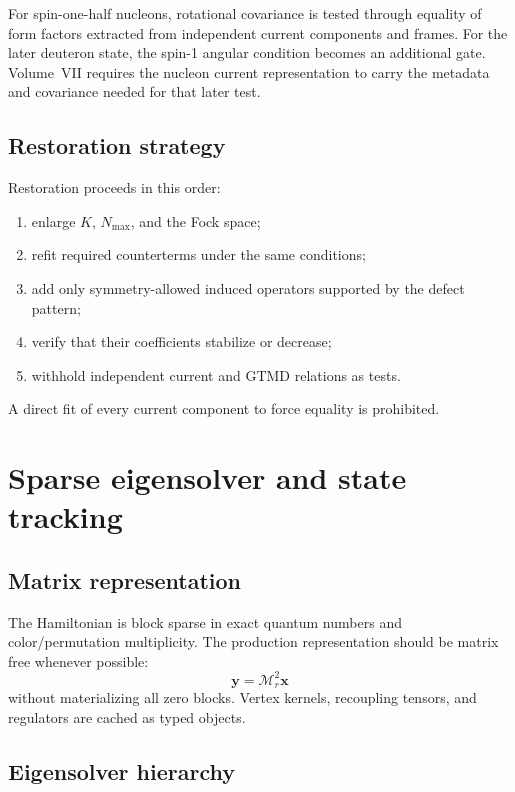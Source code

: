 \documentclass[11pt]{article}
\newcommand{\cM}{\mathcal M}
\begin{document}
For spin-one-half nucleons, rotational covariance is tested through equality of
form factors extracted from independent current components and frames.  For
the later deuteron state, the spin-1 angular condition becomes an additional
gate.  Volume~VII requires the nucleon current representation to carry the
metadata and covariance needed for that later test.

\subsection{Restoration strategy}

Restoration proceeds in this order:
\begin{enumerate}
 \item enlarge \(K\), \(N_{\max}\), and the Fock space;
 \item refit required counterterms under the same conditions;
 \item add only symmetry-allowed induced operators supported by the defect
 pattern;
 \item verify that their coefficients stabilize or decrease;
 \item withhold independent current and GTMD relations as tests.
\end{enumerate}
A direct fit of every current component to force equality is prohibited.

\section{Sparse eigensolver and state tracking}
\label{sec:solver}

\subsection{Matrix representation}

The Hamiltonian is block sparse in exact quantum numbers and color/permutation
multiplicity.  The production representation should be matrix free whenever
possible:
\begin{equation}
 \bm y=\cM_r^2\bm x
 \label{eq:matrix-free}
\end{equation}
without materializing all zero blocks.  Vertex kernels, recoupling tensors, and
regulators are cached as typed objects.

\subsection{Eigensolver hierarchy}
\end{document}
